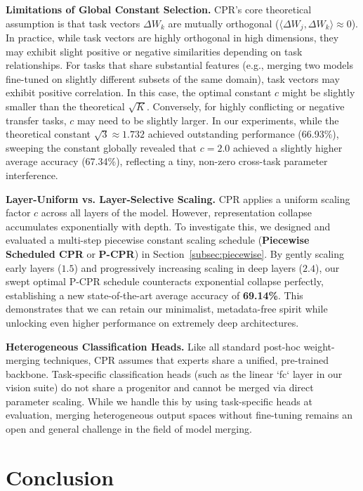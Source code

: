 \documentclass{article}
\theoremstyle{plain}
\theoremstyle{definition}
\theoremstyle{remark}
\begin{document}
\textbf{Limitations of Global Constant Selection.} CPR's core theoretical assumption is that task vectors $\Delta W_k$ are mutually orthogonal ($\langle \Delta W_j, \Delta W_k \rangle \approx 0$). In practice, while task vectors are highly orthogonal in high dimensions, they may exhibit slight positive or negative similarities depending on task relationships. For tasks that share substantial features (e.g., merging two models fine-tuned on slightly different subsets of the same domain), task vectors may exhibit positive correlation. In this case, the optimal constant $c$ might be slightly smaller than the theoretical $\sqrt{K}$. Conversely, for highly conflicting or negative transfer tasks, $c$ may need to be slightly larger. In our experiments, while the theoretical constant $\sqrt{3} \approx 1.732$ achieved outstanding performance (66.93\%), sweeping the constant globally revealed that $c = 2.0$ achieved a slightly higher average accuracy (67.34\%), reflecting a tiny, non-zero cross-task parameter interference. 

\textbf{Layer-Uniform vs. Layer-Selective Scaling.} CPR applies a uniform scaling factor $c$ across all layers of the model. However, representation collapse accumulates exponentially with depth. To investigate this, we designed and evaluated a multi-step piecewise constant scaling schedule (\textbf{Piecewise Scheduled CPR} or \textbf{P-CPR}) in Section~\ref{subsec:piecewise}. By gently scaling early layers ($1.5$) and progressively increasing scaling in deep layers ($2.4$), our swept optimal P-CPR schedule counteracts exponential collapse perfectly, establishing a new state-of-the-art average accuracy of \textbf{69.14\%}. This demonstrates that we can retain our minimalist, metadata-free spirit while unlocking even higher performance on extremely deep architectures.

\textbf{Heterogeneous Classification Heads.} Like all standard post-hoc weight-merging techniques, CPR assumes that experts share a unified, pre-trained backbone. Task-specific classification heads (such as the linear `fc` layer in our vision suite) do not share a progenitor and cannot be merged via direct parameter scaling. While we handle this by using task-specific heads at evaluation, merging heterogeneous output spaces without fine-tuning remains an open and general challenge in the field of model merging.

\section{Conclusion}
\label{sec:conclusion}
\end{document}
